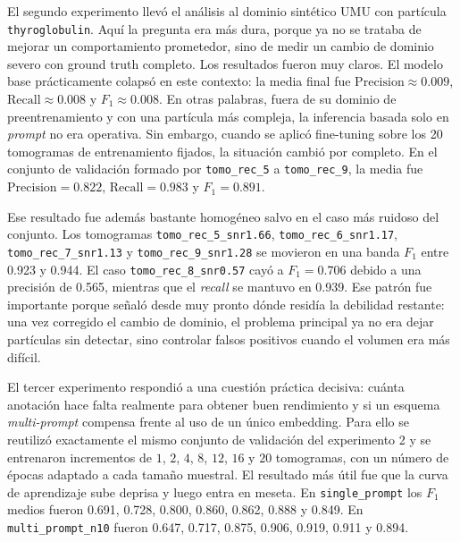 \documentclass[12pt,a4paper]{report}
\begin{document}
El segundo experimento llevó el análisis al dominio sintético UMU con partícula \texttt{thyroglobulin}. Aquí la pregunta era más dura, porque ya no se trataba de mejorar un comportamiento prometedor, sino de medir un cambio de dominio severo con ground truth completo. Los resultados fueron muy claros. El modelo base prácticamente colapsó en este contexto: la media final fue \(\mathrm{Precision}\approx0.009\), \(\mathrm{Recall}\approx0.008\) y \(F_1\approx0.008\). En otras palabras, fuera de su dominio de preentrenamiento y con una partícula más compleja, la inferencia basada solo en \emph{prompt} no era operativa. Sin embargo, cuando se aplicó fine-tuning sobre los 20 tomogramas de entrenamiento fijados, la situación cambió por completo. En el conjunto de validación formado por \texttt{tomo\_rec\_5} a \texttt{tomo\_rec\_9}, la media fue \(\mathrm{Precision}=0.822\), \(\mathrm{Recall}=0.983\) y \(F_1=0.891\).

Ese resultado fue además bastante homogéneo salvo en el caso más ruidoso del conjunto. Los tomogramas \texttt{tomo\_rec\_5\_snr1.66}, \texttt{tomo\_rec\_6\_snr1.17}, \texttt{tomo\_rec\_7\_snr1.13} y \texttt{tomo\_rec\_9\_snr1.28} se movieron en una banda \(F_1\) entre 0.923 y 0.944. El caso \texttt{tomo\_rec\_8\_snr0.57} cayó a \(F_1=0.706\) debido a una precisión de 0.565, mientras que el \emph{recall} se mantuvo en 0.939. Ese patrón fue importante porque señaló desde muy pronto dónde residía la debilidad restante: una vez corregido el cambio de dominio, el problema principal ya no era dejar partículas sin detectar, sino controlar falsos positivos cuando el volumen era más difícil.

El tercer experimento respondió a una cuestión práctica decisiva: cuánta anotación hace falta realmente para obtener buen rendimiento y si un esquema \emph{multi-prompt} compensa frente al uso de un único embedding. Para ello se reutilizó exactamente el mismo conjunto de validación del experimento 2 y se entrenaron incrementos de \(1\), \(2\), \(4\), \(8\), \(12\), \(16\) y \(20\) tomogramas, con un número de épocas adaptado a cada tamaño muestral. El resultado más útil fue que la curva de aprendizaje sube deprisa y luego entra en meseta. En \texttt{single\_prompt} los \(F_1\) medios fueron 0.691, 0.728, 0.800, 0.860, 0.862, 0.888 y 0.849. En \texttt{multi\_prompt\_n10} fueron 0.647, 0.717, 0.875, 0.906, 0.919, 0.911 y 0.894.
\end{document}
